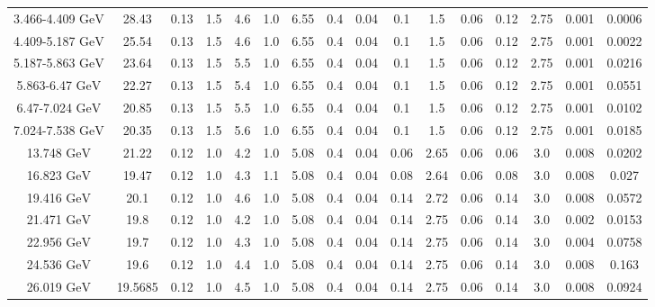 \documentclass[11pt]{article}
\begin{document}
\begin{table}[htbp]
{\begin{tabular}{cccccccccccccccc}
				3.466-4.409 ${\textrm{GeV}}$ & 28.43 & 0.13 & 1.5 & 4.6 & 1.0 & 6.55 & 0.4 & 0.04 & 0.1 & 1.5 & 0.06 & 0.12 & 2.75 & 0.001 & 0.0006 \\
				4.409-5.187 ${\textrm{GeV}}$ & 25.54 & 0.13 & 1.5 & 4.6 & 1.0 & 6.55 & 0.4 & 0.04 & 0.1 & 1.5 & 0.06 & 0.12 & 2.75 & 0.001 & 0.0022 \\
				5.187-5.863 ${\textrm{GeV}}$ & 23.64 & 0.13 & 1.5 & 5.5 & 1.0 & 6.55 & 0.4 & 0.04 & 0.1 & 1.5 & 0.06 & 0.12 & 2.75 & 0.001 & 0.0216 \\
				5.863-6.47 ${\textrm{GeV}}$ & 22.27 & 0.13 & 1.5 & 5.4 & 1.0 & 6.55 & 0.4 & 0.04 & 0.1 & 1.5 & 0.06 & 0.12 & 2.75 & 0.001 & 0.0551 \\
				6.47-7.024 ${\textrm{GeV}}$ & 20.85 & 0.13 & 1.5 & 5.5 & 1.0 & 6.55 & 0.4 & 0.04 & 0.1 & 1.5 & 0.06 & 0.12 & 2.75 & 0.001 & 0.0102 \\
				7.024-7.538 ${\textrm{GeV}}$ & 20.35 & 0.13 & 1.5 & 5.6 & 1.0 & 6.55 & 0.4 & 0.04 & 0.1 & 1.5 & 0.06 & 0.12 & 2.75 & 0.001 & 0.0185 \\
				\midrule
				13.748 ${\textrm{GeV}}$ & 21.22 & 0.12 & 1.0 & 4.2 & 1.0 & 5.08 & 0.4 & 0.04 & 0.06 & 2.65 & 0.06 & 0.06 & 3.0 & 0.008 & 0.0202 \\
				16.823 ${\textrm{GeV}}$ & 19.47 & 0.12 & 1.0 & 4.3 & 1.1 & 5.08 & 0.4 & 0.04 & 0.08 & 2.64 & 0.06 & 0.08 & 3.0 & 0.008 & 0.027 \\
				19.416 ${\textrm{GeV}}$ & 20.1 & 0.12 & 1.0 & 4.6 & 1.0 & 5.08 & 0.4 & 0.04 & 0.14 & 2.72 & 0.06 & 0.14 & 3.0 & 0.008 & 0.0572 \\
				21.471 ${\textrm{GeV}}$ & 19.8 & 0.12 & 1.0 & 4.2 & 1.0 & 5.08 & 0.4 & 0.04 & 0.14 & 2.75 & 0.06 & 0.14 & 3.0 & 0.002 & 0.0153 \\
				22.956 ${\textrm{GeV}}$ & 19.7 & 0.12 & 1.0 & 4.3 & 1.0 & 5.08 & 0.4 & 0.04 & 0.14 & 2.75 & 0.06 & 0.14 & 3.0 & 0.004 & 0.0758 \\
				24.536 ${\textrm{GeV}}$ & 19.6 & 0.12 & 1.0 & 4.4 & 1.0 & 5.08 & 0.4 & 0.04 & 0.14 & 2.75 & 0.06 & 0.14 & 3.0 & 0.008 & 0.163 \\
				26.019 ${\textrm{GeV}}$ & 19.5685 & 0.12 & 1.0 & 4.5 & 1.0 & 5.08 & 0.4 & 0.04 & 0.14 & 2.75 & 0.06 & 0.14 & 3.0 & 0.008 & 0.0924 \\
				\bottomrule
				\bottomrule
			\end{tabular}
}
\end{table}
\end{document}
